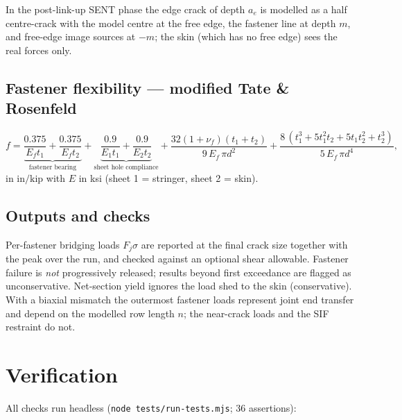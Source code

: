 \documentclass[11pt]{article}
\begin{document}
In the post-link-up SENT phase the edge crack of depth $a_e$ is modelled as
a half centre-crack with the model centre at the free edge, the fastener
line at depth $m$, and free-edge image sources at $-m$; the skin (which has
no free edge) sees the real forces only.

\subsection{Fastener flexibility --- modified Tate \& Rosenfeld}

\begin{equation}
  f=\underbrace{\frac{0.375}{E_f t_1}+\frac{0.375}{E_f t_2}}_{\text{fastener bearing}}
  +\underbrace{\frac{0.9}{E_1 t_1}+\frac{0.9}{E_2 t_2}}_{\text{sheet hole compliance}}
  +\frac{32(1+\nu_f)(t_1+t_2)}{9\,E_f\,\pi d^2}
  +\frac{8\,(t_1^3+5t_1^2t_2+5t_1t_2^2+t_2^3)}{5\,E_f\,\pi d^4},
\end{equation}
in $\mathrm{in/kip}$ with $E$ in ksi (sheet 1 = stringer, sheet 2 = skin).

\subsection{Outputs and checks}

Per-fastener bridging loads $F_j\sigma$ are reported at the final crack size
together with the peak over the run, and checked against an optional shear
allowable. Fastener failure is \emph{not} progressively released; results
beyond first exceedance are flagged as unconservative. Net-section yield
ignores the load shed to the skin (conservative). With a biaxial mismatch
the outermost fastener loads represent joint end transfer and depend on the
modelled row length $n$; the near-crack loads and the SIF restraint do not.

\section{Verification}

All checks run headless (\texttt{node tests/run-tests.mjs}; 36 assertions):
\end{document}
